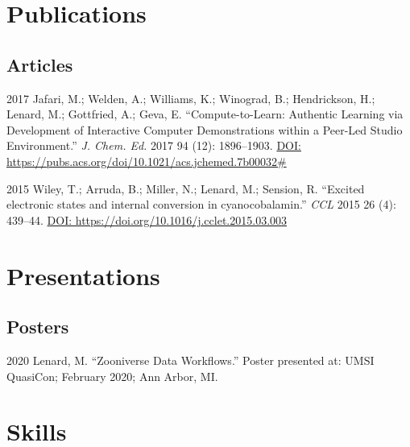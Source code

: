 \documentclass[12pt,letterpaper]{report}
\begin{document}
\section*{Publications}

\subsection*{Articles}

\begin{tablist}
   
        \item[2017] \tab Jafari, M.; Welden, A.; Williams, K.; Winograd, B.; Hendrickson, H.; Lenard, M.; Gottfried, A.; Geva, E. \enquote{Compute-to-Learn: Authentic Learning via Development of Interactive Computer Demonstrations within a Peer-Led Studio Environment.} \textit{J. Chem. Ed.} 2017 94 (12): 1896--1903. \href{https://pubs.acs.org/doi/10.1021/acs.jchemed.7b00032\#}{DOI: https://pubs.acs.org/doi/10.1021/acs.jchemed.7b00032\#}

        \item[2015] \tab Wiley, T.; Arruda, B.; Miller, N.; Lenard, M.; Sension, R. \enquote{Excited electronic states and internal conversion in cyanocobalamin.} \textit{CCL} 2015 26 (4): 439--44. \href{https://doi.org/10.1016/j.cclet.2015.03.003}{DOI: https://doi.org/10.1016/j.cclet.2015.03.003}

\end{tablist}



\section*{Presentations}
    
\subsection*{Posters}
    
\begin{tablist}
    
	\item[2020] \tab Lenard, M. \enquote{Zooniverse Data Workflows.} Poster presented at: UMSI QuasiCon; February 2020; Ann Arbor, MI.

\end{tablist}



\section*{Skills}
\end{document}
